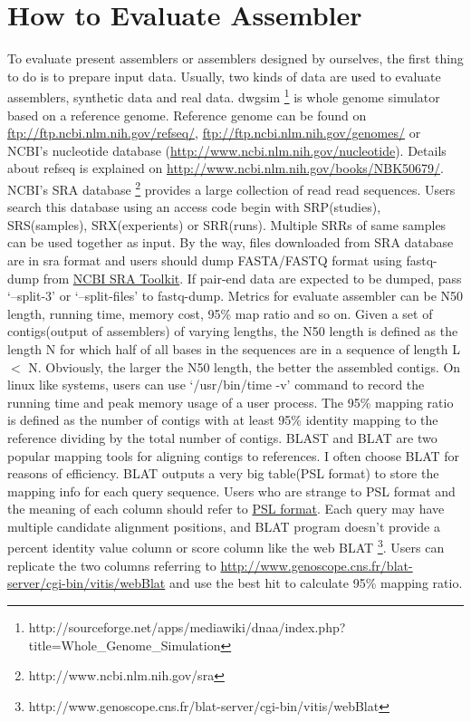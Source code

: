 \documentclass{article}
\begin{document}
\section{How to Evaluate Assembler}
To evaluate present assemblers or assemblers designed by ourselves, the first thing to do is to prepare input data. Usually, two kinds of data are used to evaluate assemblers, synthetic data and real data. dwgsim \footnote{http://sourceforge.net/apps/mediawiki/dnaa/index.php?title=Whole\_Genome\_Simulation} is whole genome simulator based on a reference genome. Reference genome can be found on \href{ftp://ftp.ncbi.nlm.nih.gov/refseq/}{ftp://ftp.ncbi.nlm.nih.gov/refseq/}, \href{ftp://ftp.ncbi.nlm.nih.gov/genomes/}{ftp://ftp.ncbi.nlm.nih.gov/genomes/} or NCBI's nucleotide database (\href{http://www.ncbi.nlm.nih.gov/nucleotide}{http://www.ncbi.nlm.nih.gov/nucleotide}). Details about refseq is explained on \href{http://www.ncbi.nlm.nih.gov/books/NBK50679/}{http://www.ncbi.nlm.nih.gov/books/NBK50679/}. NCBI's SRA database \footnote{http://www.ncbi.nlm.nih.gov/sra} provides a large collection of read read sequences. Users search this database using an access code begin with SRP(studies), SRS(samples), SRX(experients) or SRR(runs). Multiple SRRs of same samples can be used together as input. By the way, files downloaded from SRA database are in sra format and users should dump FASTA/FASTQ format using fastq-dump from \href{http://trace.ncbi.nlm.nih.gov/Traces/sra/sra.cgi?view=software}{NCBI SRA Toolkit}. If pair-end data are expected to be dumped, pass `--split-3' or `--split-files' to fastq-dump. Metrics for evaluate assembler can be N50 length, running time, memory cost, 95\% map ratio and so on. Given a set of contigs(output of assemblers) of varying lengths, the N50 length is defined as the length N for which half of all bases in the sequences are in a sequence of length L $<$ N. Obviously, the larger the N50 length, the better the assembled contigs. On linux like systems, users can use `/usr/bin/time -v' command to record the running time and peak memory usage of a user process. The 95\% mapping ratio is defined as the number of contigs with at least 95\% identity mapping to the reference dividing by the total number of contigs. BLAST \cite{altschul1990basic} and BLAT \cite{kent2002blat} are two popular mapping tools for aligning contigs to references. I often choose BLAT for reasons of efficiency. BLAT outputs a very big table(PSL format) to store the mapping info for each query sequence. Users who are strange to PSL format and the meaning of each column should refer to \href{http://genome.ucsc.edu/FAQ/FAQformat.html#format2}{PSL format}. Each query may have multiple candidate alignment positions, and BLAT program doesn't provide a percent identity value column or score column like the web BLAT \footnote{http://www.genoscope.cns.fr/blat-server/cgi-bin/vitis/webBlat}. Users can replicate the two columns referring to \href{http://www.genoscope.cns.fr/blat-server/cgi-bin/vitis/webBlat}{http://www.genoscope.cns.fr/blat-server/cgi-bin/vitis/webBlat} and use the best hit to calculate 95\% mapping ratio.
\end{document}
